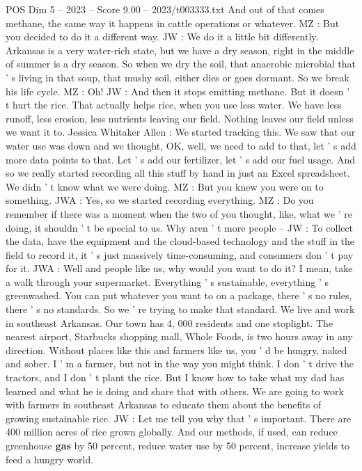 \begin{textsample}{POS Dim 5 – 2023 – Score 9.00 – 2023/t003333.txt}
And out of that comes methane, the same way it happens in cattle operations or whatever.
MZ : But you decided to do it a different way.
JW : We do it a little bit differently.
Arkansas is a very water-rich state, but we have a dry season, right in the middle of summer is a dry season.
So when we dry the soil, that anaerobic microbial that ' s living in that soup, that mushy soil, either dies or goes dormant.
So we break his life cycle.
MZ : Oh!
JW : And then it stops emitting methane.
But it doesn ' t hurt the rice.
That actually helps rice, when you use less water.
We have less runoff, less erosion, less nutrients leaving our field.
Nothing leaves our field unless we want it to.
Jessica Whitaker Allen : We started tracking this.
We saw that our water use was down and we thought, OK, well, we need to add to that, let ' s add more data points to that.
Let ' s add our fertilizer, let ' s add our fuel usage.
And so we really started recording all this stuff by hand in just an Excel spreadsheet.
We didn ' t know what we were doing.
MZ : But you knew you were on to something.
JWA : Yes, so we started recording everything.
MZ : Do you remember if there was a moment when the two of you thought, like, what we ' re doing, it shouldn ' t be special to us.
Why aren ' t more people -- JW : To collect the data, have the equipment and the cloud-based technology and the stuff in the field to record it, it ' s just massively time-consuming, and consumers don ' t pay for it.
JWA : Well and people like us, why would you want to do it?
I mean, take a walk through your supermarket.
Everything ' s sustainable, everything ' s greenwashed.
You can put whatever you want to on a package, there ' s no rules, there ' s no standards.
So we ' re trying to make that standard.
We live and work in southeast Arkansas.
Our town has 4, 000 residents and one stoplight.
The nearest airport, Starbucks shopping mall, Whole Foods, is two hours away in any direction.
Without places like this and farmers like us, you ' d be hungry, naked and sober.
I ' m a farmer, but not in the way you might think.
I don ' t drive the tractors, and I don ' t plant the rice.
But I know how to take what my dad has learned and what he is doing and share that with others.
We are going to work with farmers in southeast Arkansas to educate them about the benefits of growing sustainable rice.
JW : Let me tell you why that ' s important.
There are 400 million acres of rice grown globally.
And our methods, if used, can reduce greenhouse \textbf{gas} by 50 percent, reduce water use by 50 percent, increase yields to feed a hungry world.

\end{textsample}
